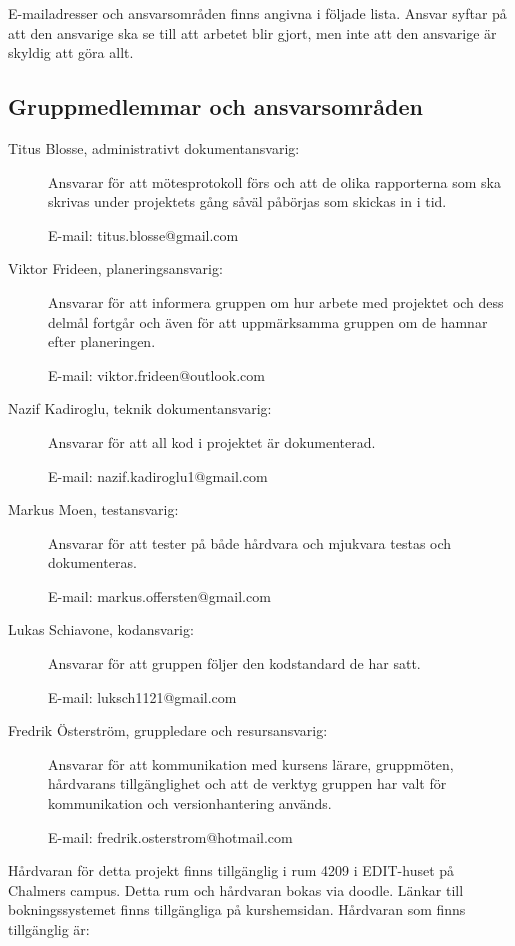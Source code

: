 \documentclass[a4paper]{article}
\begin{document}
E-mailadresser och ansvarsområden finns angivna i följade lista. Ansvar syftar på att den ansvarige ska se till att arbetet blir gjort, men inte att den ansvarige är skyldig att göra allt.

\subsection{Gruppmedlemmar och ansvarsområden}

\begin{description}
    \item[Titus Blosse, administrativt dokumentansvarig:] Ansvarar för att mötesprotokoll förs och att de olika rapporterna som ska skrivas under projektets gång såväl påbörjas som skickas in i tid.

    E-mail: titus.blosse@gmail.com

    \item[Viktor Frideen, planeringsansvarig:] Ansvarar för att informera gruppen om hur arbete med projektet och dess delmål fortgår och även för att uppmärksamma gruppen om de hamnar efter planeringen.

    E-mail: viktor.frideen@outlook.com

    \item[Nazif Kadiroglu, teknik dokumentansvarig:] Ansvarar för att all kod i projektet är dokumenterad.

    E-mail: nazif.kadiroglu1@gmail.com

    \item[Markus Moen, testansvarig:] Ansvarar för att tester på både hårdvara och mjukvara testas och dokumenteras.

    E-mail: markus.offersten@gmail.com

    \item[Lukas Schiavone, kodansvarig:] Ansvarar för att gruppen följer den kodstandard de har satt.

    E-mail: luksch1121@gmail.com

    \item[Fredrik Österström, gruppledare och resursansvarig:] Ansvarar för att kommunikation med kursens lärare, gruppmöten, hårdvarans tillgänglighet och att de verktyg gruppen har valt för kommunikation och versionhantering används.

    E-mail: fredrik.osterstrom@hotmail.com
\end{description}

Hårdvaran för detta projekt finns tillgänglig i rum 4209 i EDIT-huset på Chalmers campus. Detta rum och hårdvaran bokas via doodle. Länkar till bokningssystemet finns tillgängliga på kurshemsidan. Hårdvaran som finns tillgänglig är:
\end{document}
